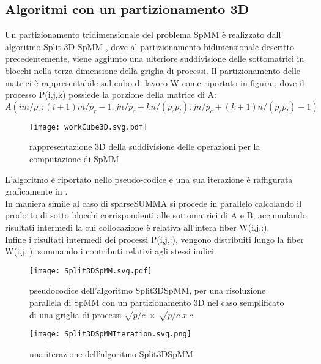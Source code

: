 \subsection{Algoritmi con un partizionamento 3D}
Un partizionamento tridimensionale del problema SpMM è realizzato dall'
algoritmo Split-3D-SpMM , dove al partizionamento
bidimensionale descritto precedentemente, viene aggiunto una ulteriore
suddivisione delle sottomatrici in blocchi nella terza dimensione della griglia di processi.
Il partizionamento delle matrici è rappresentabile sul cubo di lavoro W come
riportato in figura , dove il processo P(i,j,k) possiede la
porzione della matrice di A:\\ 
$A(im/p_r:(i+1)m/p_r - 1, jn/p_c + kn/(p_c p_l ) : jn/p_c + (k + 1)n/(p_c p_l) - 1)$  \\
\begin{figure}[H]
  \centering \texttt{[image: workCube3D.svg.pdf]}
  \caption[partizionamento 3D di SpMM]
  {rappresentazione 3D della suddivisione delle operazioni per la computazione di SpMM}
  \decoRule \label{fig:workCube3D}
\end{figure}
L'algoritmo è riportato nello pseudo-codice  e una
sua iterazione è raffigurata graficamente in .\\

In maniera simile al caso di sparseSUMMA %
si procede in parallelo calcolando il prodotto di sotto blocchi corrispondenti
alle sottomatrici di A e B, accumulando risultati intermedi la cui collocazione
è relativa all'intera fiber W(i,j,:).\\
Infine i risultati intermedi dei processi P(i,j,:), vengono distribuiti lungo la fiber
W(i,j,:), sommando i contributi relativi agli stessi indici.
\begin{figure}[H] 
  \centering 
  \texttt{[image: Split3DSpMM.svg.pdf]} 
  \caption[pseudocodice Split3DSpMM]{pseudocodice dell'algoritmo Split3DSpMM, 
     per una risoluzione parallela di SpMM con un partizionamento 3D
     nel caso semplificato di una griglia di processi $\sqrt{p/c}~\times~\sqrt{p/c}~x~c$}
  \decoRule \label{figCode:Split3DSpMM}
\end{figure}
\begin{figure}[H]
  \centering \texttt{[image: Split3DSpMMIteration.svg.png]} 
  \caption{una iterazione dell'algoritmo Split3DSpMM}
  \decoRule \label{fig:Split3DSpMMIteration}
\end{figure}
\clearpage
